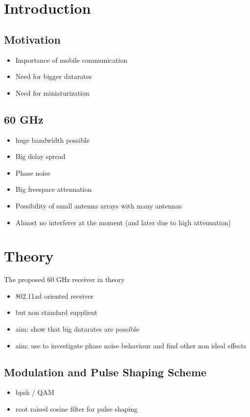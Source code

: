 \chapter{Introduction}

\section{Motivation}
\begin{itemize}
\item Importance of mobile communication
\item Need for bigger datarates
\item Need for miniaturization
\end{itemize}

\section{60 GHz}
\begin{itemize}
\item huge bandwidth possible
\item Big delay spread
\item Phase noise
\item Big freespace attenuation
\item Possibility of small antenna arrays with many antennas
\item Almost no interferer at the moment (and later due to high attenuation)
\end{itemize}

\chapter{Theory}
The proposed 60 GHz receiver in theory

\begin{itemize}
\item 802.11ad oriented receiver
\item but non standard supplient
\item aim: show that big datarates are possible
\item aim: use to investigate phase noise behaviour and find other non ideal effects
\end{itemize}

\section{Modulation and Pulse Shaping Scheme}
\begin{itemize}
\item bpsk / QAM
\item root raised cosine filter for pulse shaping
\end{itemize}

